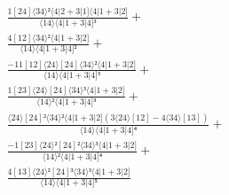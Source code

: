 \documentclass[varwidth, border=5pt]{standalone}
\begin{document}
\begin{my}
$\begin{gathered}
\scriptscriptstyle\frac{1[24]⟨34⟩²⟨4|2+3|1]⟨4|1+3|2]}{⟨14⟩⟨4|1+3|4]³} +\\
\scriptscriptstyle\frac{4[12]⟨34⟩²⟨4|1+3|2]}{⟨14⟩⟨4|1+3|4]²} +\\
\scriptscriptstyle\frac{-11[12]⟨24⟩[24]⟨34⟩²⟨4|1+3|2]}{⟨14⟩⟨4|1+3|4]³} +\\
\scriptscriptstyle\frac{1[23]⟨24⟩[24]⟨34⟩³⟨4|1+3|2]}{⟨14⟩²⟨4|1+3|4]³} +\\
\scriptscriptstyle\frac{⟨24⟩[24]²⟨34⟩²⟨4|1+3|2](3⟨24⟩[12]-4⟨34⟩[13])}{⟨14⟩⟨4|1+3|4]⁴} +\\
\scriptscriptstyle\frac{-1[23]⟨24⟩²[24]²⟨34⟩³⟨4|1+3|2]}{⟨14⟩²⟨4|1+3|4]⁴} +\\
\scriptscriptstyle\frac{4[13]⟨24⟩²[24]³⟨34⟩³⟨4|1+3|2]}{⟨14⟩⟨4|1+3|4]⁵} \phantom{+}
\end{gathered}$
\end{my}
\end{document}
